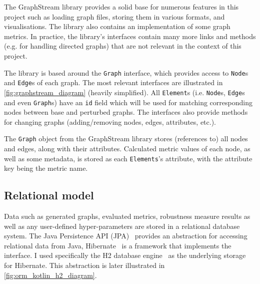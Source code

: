 The GraphStream library provides a solid base for numerous features in this project such as loading graph files, storing them in various formats, and visualisations.
The library also contains an implementation of some graph metrics.
In practice, the library's interfaces contain many more links and methods (e.g. for handling directed graphs) that are not relevant in the context of this project.



The library is based around the \texttt{Graph} interface, which provides access to \texttt{Node}s and \texttt{Edge}s of each graph.
The most relevant interfaces are illustrated in \autoref{fig:graphstream_diagram} (heavily simplified).
All \texttt{Element}s (i.e. \texttt{Node}s, \texttt{Edge}s and even \texttt{Graph}s) have an \texttt{id} field which will be used for matching corresponding nodes between base and perturbed graphs.
The interfaces also provide methods for changing graphs (adding/removing nodes, edges, attributes, etc.).

The \texttt{Graph} object from the GraphStream library stores (references to) all nodes and edges, along with their attributes.
Calculated metric values of each node, as well as some metadata, is stored as each \texttt{Elements}'s attribute, with the attribute key being the metric name.

\subsection{Relational model}

Data such as generated graphs, evaluated metrics, robustness measure results as well as any user-defined hyper-parameters are stored in a relational database system.
The Java Persistence API (JPA)~\cite{BiswasJavaPersistenceAPI2016} provides an abstraction for accessing relational data from Java, Hibernate~\cite{ElliottHibernateDeveloperNotebook2004,BauerJavaPersistenceHibernate2015} is a framework that implements the interface.
I used specifically the H2 database engine~\cite{MuellerH2DatabaseEngine2006} as the underlying storage for Hibernate.
This abstraction is later illustrated in \autoref{fig:orm_kotlin_h2_diagram}.



